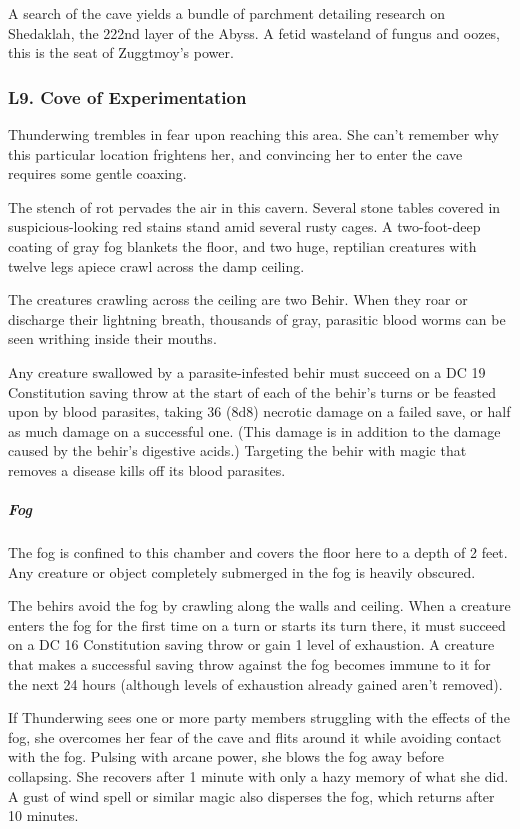 \documentclass[10pt,a4paper,twoside,bg=print,twocolumn,openany,nodeprecatedcode]{dndbook}
\begin{document}
A search of the cave yields a bundle of parchment detailing research on Shedaklah, the 222nd layer of the Abyss. A fetid wasteland of fungus and oozes, this is the seat of Zuggtmoy's power.

\subsubsection{L9. Cove of Experimentation}
Thunderwing trembles in fear upon reaching this area. She can't remember why this particular location frightens her, and convincing her to enter the cave requires some gentle coaxing.

\begin{DndReadAloud}{}
The stench of rot pervades the air in this cavern. Several stone tables covered in suspicious-looking red stains stand amid several rusty cages. A two-foot-deep coating of gray fog blankets the floor, and two huge, reptilian creatures with twelve legs apiece crawl across the damp ceiling.

\end{DndReadAloud}

The creatures crawling across the ceiling are two Behir. When they roar or discharge their lightning breath, thousands of gray, parasitic blood worms can be seen writhing inside their mouths.

Any creature swallowed by a parasite-infested behir must succeed on a DC 19 Constitution saving throw at the start of each of the behir's turns or be feasted upon by blood parasites, taking 36 (8d8) necrotic damage on a failed save, or half as much damage on a successful one. (This damage is in addition to the damage caused by the behir's digestive acids.) Targeting the behir with magic that removes a disease kills off its blood parasites.

\subparagraph{Fog}
The fog is confined to this chamber and covers the floor here to a depth of 2 feet. Any creature or object completely submerged in the fog is heavily obscured.

The behirs avoid the fog by crawling along the walls and ceiling. When a creature enters the fog for the first time on a turn or starts its turn there, it must succeed on a DC 16 Constitution saving throw or gain 1 level of exhaustion. A creature that makes a successful saving throw against the fog becomes immune to it for the next 24 hours (although levels of exhaustion already gained aren't removed).

If Thunderwing sees one or more party members struggling with the effects of the fog, she overcomes her fear of the cave and flits around it while avoiding contact with the fog. Pulsing with arcane power, she blows the fog away before collapsing. She recovers after 1 minute with only a hazy memory of what she did. A gust of wind spell or similar magic also disperses the fog, which returns after 10 minutes.
\end{document}
